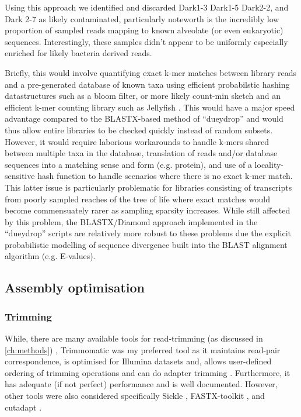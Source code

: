 Using this approach we identified and discarded Dark1-3 Dark1-5 Dark2-2, and Dark 2-7 as likely contaminated, particularly noteworth is the incredibly
low proportion of sampled reads mapping to known alveolate (or even eukaryotic) sequences.   Interestingly, these samples didn't appear to be uniformly
especially enriched for likely bacteria derived reads.  


Briefly, this would involve quantifying exact k-mer matches between library reads and a pre-generated database of known taxa
using efficient probabilstic hashing datastructures such as a bloom filter, or more likely count-min sketch and an efficient
k-mer counting library such as Jellyfish \citep{Marcais2011}.  This would have a major speed advantage compared to the BLASTX-based method of ``dueydrop''
and would thus allow entire libraries to be checked quickly instead of random subsets.  However, it would require laborious workarounds to handle
k-mers shared between multiple taxa in the database, translation of reads and/or database sequences into a matching sense and form (e.g. protein),
and use of a locality-sensitive hash function to handle scenarios where there is no exact k-mer match. This latter issue is particularly
problematic for libraries consisting of transcripts from poorly sampled reaches of the tree of life where exact matches would become
commensuately rarer as sampling sparsity increases.  
While still affected by this problem, the BLASTX/Diamond approach implemented in the ``dueydrop'' scripts are relatively more robust to these
problems due the explicit probabilistic modelling of sequence divergence built into the BLAST alignment algorithm (e.g. E-values).





\subsection{Assembly optimisation}

\subsubsection{Trimming}
While, there are many available tools for read-trimming (as discussed in \ref{ch:methods}) , 
Trimmomatic was my preferred tool as it maintains read-pair correspondence, is optimised for Illumina datasets and, allows user-defined ordering of trimming operations and can do adapter trimming \citep{Bolger2014a}.  
Furthermore, it has adequate (if not perfect) performance and is well documented.
However, other tools were also considered specifically Sickle \citep{JoshiGitHub}, FASTX-toolkit \citep{gordon2010fastx}, 
and cutadapt \citep{martin2011cutadapt}.

